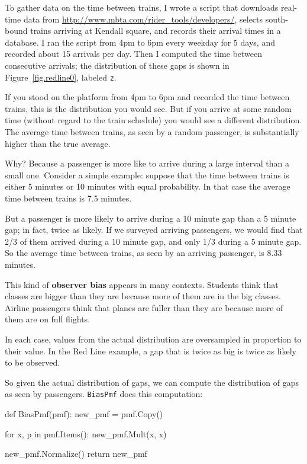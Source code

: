\documentclass[12pt]{book}
\theoremstyle{exercise}
\begin{document}
To gather data on the time between trains, I wrote a script that
downloads real-time data from
\url{http://www.mbta.com/rider_tools/developers/}, selects south-bound
trains arriving at Kendall square, and records their arrival times
in a database.  I ran the script from 4pm to 6pm every weekday
for 5 days, and recorded about 15 arrivals per day.  Then
I computed the time between consecutive arrivals; the distribution
of these gaps is shown in Figure~\ref{fig.redline0}, labeled {\tt z}.

If you stood on the platform from 4pm to 6pm and recorded the time
between trains, this is the distribution you would see.  But if you
arrive at some random time (without regard to the train schedule) you
would see a different distribution.  The average time
between trains, as seen by a random passenger, is substantially
higher than the true average.

Why?  Because a passenger is more like to arrive during a
large interval than a small one.  Consider a simple example:
suppose that the time between trains is either 5 minutes
or 10 minutes with equal probability.  In that case
the average time between
trains is 7.5 minutes.

But a passenger is more likely to arrive during a 10 minute gap 
than a 5 minute gap; in fact, twice as likely.  If we surveyed
arriving passengers, we would find that 2/3 of them arrived during
a 10 minute gap, and only 1/3 during a 5 minute gap.  So the
average time between trains, as seen by an arriving passenger,
is 8.33 minutes.

This kind of {\bf observer bias} appears in many contexts.  Students
think that classes are bigger than they are because more of them are
in the big classes.  Airline passengers think that planes are fuller
than they are because more of them are on full flights.

In each case, values from the actual distribution are
oversampled in proportion to their value.  In the Red Line example,
a gap that is twice as big is twice as likely to be observed.

So given the actual distribution of gaps, we can compute the
distribution of gaps as seen by passengers.  {\tt BiasPmf}
does this computation:

\begin{code}
def BiasPmf(pmf):
    new_pmf = pmf.Copy()

    for x, p in pmf.Items():
        new_pmf.Mult(x, x)
        
    new_pmf.Normalize()
    return new_pmf
\end{code}
\end{document}
